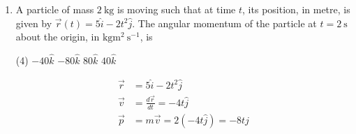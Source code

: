 \begin{enumerate}
\begin{answer}
	\begin{align}
	\text{Equation of motion }\frac{d p}{d t}&=m g\label{20}\\
	\text{given }\frac{d r}{d t}&=k \Rightarrow r=k t\text{ (if initial radius is zero)}\notag\\
	\text{since }m&=\frac{4}{3} \pi r^{3} \rho \quad \therefore \frac{d m}{d t}=4 \pi r^{2} \cdot \frac{d r}{d t} \cdot \rho\notag
\intertext{	$\rho$ is density, we assume it to be constant}\notag
	\frac{d m}{d t} &=\left(\frac{4}{3} \pi r^{3} \rho\right) \cdot \frac{3 k}{r} \notag\\
	\frac{d m}{d t} &=\frac{3 m k}{r}\label{21}\\
\intertext{	Dividing (\ref{20}) by (\ref{21}) we get}\notag
\frac{d p}{d m}&=\frac{g}{3 k} r \quad d p=\left(\frac{g}{3 k}\right) \cdot\left(\frac{3 m}{4 \pi \rho}\right)^{1 / 3} d m\notag\\
\intertext{on integration we get}\notag
\therefore \quad p&=\left(\frac{g}{3 k}\right)\left(\frac{3}{4 \pi \rho}\right)^{1 / 3} \cdot \frac{m^{4 / 3}}{4 / 3}+c\notag\\
\text{taking }p&=m=0\text{ at }t=0,\text{ we get }c=0\notag\\
\therefore \quad p&=\frac{g}{4 k}\left(\frac{3}{4 \pi \rho}\right)^{1 / 3} \cdot m^{4 / 3}\notag\\
\text{or }v&=\left(\frac{g}{4 k}\right) \cdot\left(\frac{3 m}{4 \pi \rho}\right)^{1 / 3}\notag\\
v&=\frac{g}{4 k} r \Rightarrow v=\frac{g}{4} t\notag
	\end{align}
\end{answer}
	\item A particle of mass $2 \mathrm{~kg}$ is moving such that at time $t$, its position, in metre, is given by $\vec{r}(t)=5 \hat{i}-2 t^{2} \hat{j}$. The angular momentum of the particle at $t=2 \mathrm{~s}$ about the origin, in $\mathrm{kg} \mathrm{m}^{2} \mathrm{~s}^{-1}$, is
	 \begin{tasks}(4)
		\task[\textbf{a.}]$-40 \hat{k}$
		\task[\textbf{b.}]$-80 \hat{k}$
		\task[\textbf{c.}]$80 \hat{k}$
		\task[\textbf{d.}]  $40 \hat{k}$
	\end{tasks}
	\begin{answer}
		\begin{align*}
		\vec{r} &=5 \hat{i}-2 t^{2} \hat{j} \\
		\vec{v} &=\frac{d \vec{r}}{d t}=-4 t \hat{j} \\
		\vec{p} &=m \vec{v}=2(-4 t \hat{j})=-8 t \hat{j} \\

\end{align*}
\end{answer}
\end{enumerate}
